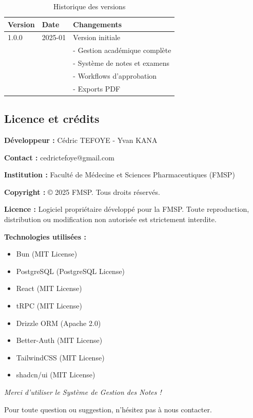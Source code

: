\begin{table}[h]
\centering
\begin{tabular}{|l|l|p{8cm}|}
\hline
\textbf{Version} & \textbf{Date} & \textbf{Changements} \\
\hline
1.0.0 & 2025-01 & Version initiale \\
& & - Gestion académique complète \\
& & - Système de notes et examens \\
& & - Workflows d'approbation \\
& & - Exports PDF \\
\hline
\end{tabular}
\caption{Historique des versions}
\end{table}

\subsection{Licence et crédits}

\begin{tcolorbox}[colback=gray!10!white,colframe=gray!75!black,title=Informations légales]

\textbf{Développeur :} Cédric TEFOYE - Yvan KANA

\textbf{Contact :} cedrictefoye@gmail.com

\textbf{Institution :} Faculté de Médecine et Sciences Pharmaceutiques (FMSP)

\textbf{Copyright :} © 2025 FMSP. Tous droits réservés.

\textbf{Licence :} Logiciel propriétaire développé pour la FMSP. Toute reproduction, distribution ou modification non autorisée est strictement interdite.

\textbf{Technologies utilisées :}
\begin{itemize}[leftmargin=*]
    \item Bun (MIT License)
    \item PostgreSQL (PostgreSQL License)
    \item React (MIT License)
    \item tRPC (MIT License)
    \item Drizzle ORM (Apache 2.0)
    \item Better-Auth (MIT License)
    \item TailwindCSS (MIT License)
    \item shadcn/ui (MIT License)
\end{itemize}

\end{tcolorbox}

\vspace{1cm}

\begin{center}
\textit{Merci d'utiliser le Système de Gestion des Notes !}

\vspace{0.5cm}

Pour toute question ou suggestion, n'hésitez pas à nous contacter.
\end{center}


